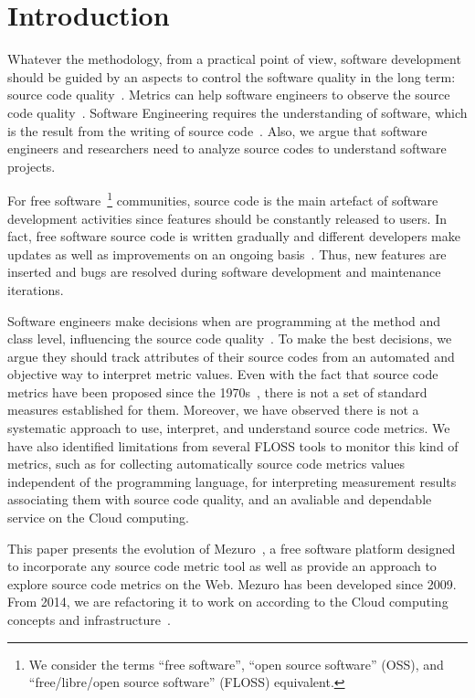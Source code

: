 \section{Introduction}
\label{introduction}

Whatever the methodology, from a practical point of view, software development
should be guided by an aspects to control the software quality in the long
term: source code quality~\cite{martin2008}. Metrics can help software
engineers to observe the source code quality~\cite{SEI88}. Software Engineering
requires the understanding of software, which is the result from the writing of
source code~\cite{martin2008}. Also, we argue that software engineers and
researchers need to analyze source codes to understand software projects.

For free software~\footnote{We consider the terms ``free software'', ``open
source software'' (OSS), and  ``free/libre/open source software'' (FLOSS)
equivalent.} communities, source code is the main artefact of software
development activities since features should be constantly released to users.
In fact, free software source code is written gradually and different
developers make updates as well as improvements on an ongoing
basis~\cite{martin2008}. Thus, new features are inserted and bugs are resolved
during software development and maintenance iterations.

Software engineers make decisions when are programming at the method and class
level, influencing the source code quality~\cite{beck2007}. To make the best
decisions, we argue they should track attributes of their source codes from an
automated and objective way to interpret metric values. Even with the fact that
source code metrics have been proposed since the 1970s~\cite{SEI88}, there is
not a set of standard measures established for them.  Moreover, we have
observed there is not a systematic approach to use, interpret, and understand
source code metrics. We have also identified limitations from several FLOSS
tools to monitor this kind of metrics, such as for collecting automatically
source code metrics values independent of the programming language, for
interpreting measurement results associating them with source code quality, and
an avaliable and dependable service on the Cloud computing.

This paper presents the evolution of Mezuro~\cite{mezuro2012}, a free software
platform designed to incorporate any source code metric tool as well as provide
an approach to explore source code metrics on the Web. Mezuro has been
developed since 2009. From 2014, we are refactoring it to work on according to
the Cloud computing concepts and infrastructure~\cite{louridas2010}.

